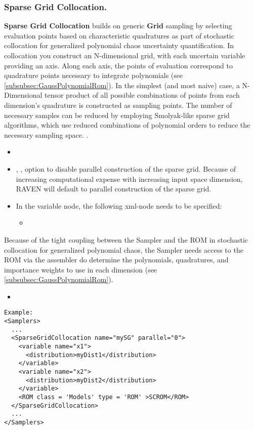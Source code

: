 \subsubsection{Sparse Grid Collocation.}
\label{subsubsubsec:SparseGridCollocation}
\textbf{Sparse Grid Collocation} builds on generic \textbf{Grid} sampling by selecting evaluation points based on characteristic quadratures as part of stochastic collocation for generalized polynomial chaos uncertainty quantification.  In collocation you construct an N-dimensional grid, with each uncertain variable providing an axis.  Along each axis, the points of evaluation correspond to quadrature points necessary to integrate polynomials (see \ref{subsubsec:GaussPolynomialRom}).  In the simplest (and most  naive) case, a N-Dimensional tensor product of all possible combinations of points from each dimension's quadrature is constructed as sampling points.  The number of necessary samples can be reduced by employing Smolyak-like sparse grid algorithms, which use reduced combinations of polynomial orders to reduce the necessary sampling space.  .
\begin{itemize}
\itemsep0em
\item \nameDescription
\item {}, , option to disable parallel construction of the sparse grid.  Because of increasing computational expense with increasing input space dimension, RAVEN will default to parallel construction of the sparse grid.  
\end{itemize}
\begin{itemize}
\item \variableDescription
 In the variable node, the following xml-node needs to be specified:
 \begin{itemize}
    \item \distributionDescription
 \end{itemize} \end{itemize}
Because of the tight coupling between the Sampler and the ROM in stochastic collocation for generalized polynomial chaos, the Sampler needs access to the ROM via the assembler do determine the polynomials, quadratures, and importance weights to use in each dimension (see \ref{subsubsec:GaussPolynomialRom}).  
\begin{itemize}

  \item \assemblerROMDescription

\end{itemize}
\footnotesize
\begin{lstlisting}[style=XML]
Example:
<Samplers>
  ...
  <SparseGridCollocation name="mySG" parallel="0">
    <variable name="x1">
      <distribution>myDist1</distribution>
    </variable>
    <variable name="x2">
      <distribution>myDist2</distribution>
    </variable>
    <ROM class = 'Models' type = 'ROM' >SCROM</ROM>
  </SparseGridCollocation>
  ...
</Samplers>
\end{lstlisting}
 \normalsize
 
